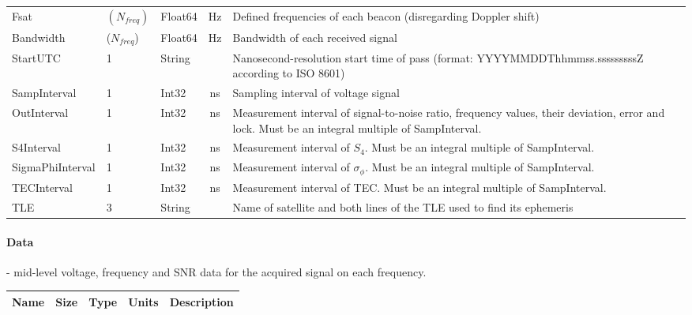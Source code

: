 \documentclass[12pt]{article}
\begin{document}
\begin{small}
\begin{scriptsize}
\begin{tabular}{|l|l|l|c|p{7cm}|}
Fsat & $(N_{freq})$ & Float64 & Hz & Defined frequencies of each beacon (disregarding Doppler shift)\\
Bandwidth & ($N_{freq}$) & Float64 & Hz & Bandwidth of each received signal\\
StartUTC & 1 & String & & Nanosecond-resolution start time of pass (format: \mbox{YYYYMMDDThhmmss.sssssssssZ} according to ISO 8601) \\
SampInterval & 1 & Int32 & ns & Sampling interval of voltage signal\\
OutInterval & 1 & Int32 & ns & Measurement interval of signal-to-noise ratio, frequency values, their deviation, error and lock. Must be an integral multiple of SampInterval.\\
S4Interval & 1 & Int32 & ns & Measurement interval of $S_4$. Must be an integral multiple of SampInterval.\\
SigmaPhiInterval & 1 & Int32 & ns & Measurement interval of $\sigma _\phi$. Must be an integral multiple of SampInterval.\\
TECInterval & 1 & Int32 & ns & Measurement interval of TEC. Must be an integral multiple of SampInterval.\\
TLE & 3 & String & & Name of satellite and both lines of the TLE used to find its ephemeris\\
\hline
\end{tabular}
\end{scriptsize}

\paragraph{Data}- mid-level voltage, frequency and SNR data for the acquired signal on each frequency. \\
\begin{scriptsize}
\begin{tabular}{|l|l|l|c|p{7cm}|}
\hline
\textbf{Name} & \textbf{Size} & \textbf{Type} & \textbf{Units} & \textbf{Description} \\
\hline


\end{tabular}
\end{scriptsize}
\end{small}
\end{document}
